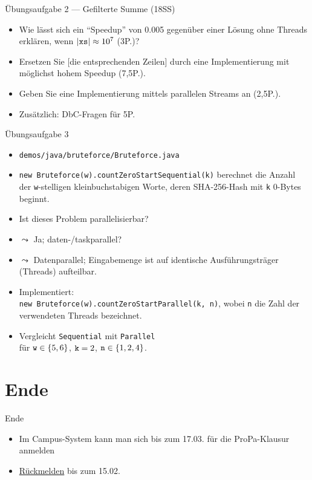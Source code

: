 \documentclass{beamer}
\begin{document}
\begin{frame}{Übungsaufgabe 2 --- Gefilterte Summe (18SS)}

	\begin{itemize}
		\item Wie lässt sich ein \enquote{Speedup} von 0.005 gegenüber einer Lösung ohne Threads erklären, wenn $|\textrm{\texttt{xs}}| \approx 10^7$ (3P.)?
		\item Ersetzen Sie [die entsprechenden Zeilen] durch eine Implementierung mit möglichst hohem Speedup (7,5P.).
		\item Geben Sie eine Implementierung mittels parallelen Streams an (2,5P.).
		\item Zusätzlich: DbC-Fragen für 5P.
	\end{itemize}
\end{frame}

\begin{frame}{Übungsaufgabe 3}
	\begin{itemize}
		\item \texttt{demos/java/bruteforce/Bruteforce.java}
		\item \texttt{new Bruteforce(w).countZeroStartSequential(k)} berechnet die Anzahl der \texttt{w}-stelligen kleinbuchstabigen Worte, deren SHA-256-Hash mit \texttt{k} 0-Bytes beginnt.
		\item Ist dieses Problem parallelisierbar?
		\pause
		\item $\leadsto$ Ja; daten-/taskparallel?
		\pause
		\item $\leadsto$ Datenparallel; Eingabemenge ist auf identische Ausführungsträger (Threads) aufteilbar.
		\pause
		\item Implementiert:\\
		      \texttt{new Bruteforce(w).countZeroStartParallel(k, n)}, wobei \texttt{n} die Zahl der verwendeten Threads bezeichnet.
	        \item Vergleicht \texttt{Sequential} mit \texttt{Parallel}\\
		      für $\textrm{\texttt{w}} \in \{ 5, 6 \}$, $\textrm{\texttt{k}} = 2$, $\textrm{\texttt{n}} \in \{ 1, 2, 4 \}$.
	\end{itemize}
\end{frame}


\section{Ende}

\begin{frame}{Ende}
	\begin{itemize}
		\item Im Campus-System kann man sich bis zum 17.03. für die ProPa-Klausur anmelden
		\item \href{https://campus.studium.kit.edu/renewal/payment.php}{Rückmelden} bis zum 15.02.
	\end{itemize}
\end{frame}
\end{document}
